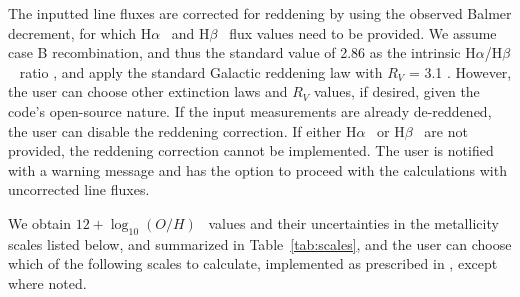 \documentclass{emulateapj}
\newcommand{\oxabinline}{\ensuremath{12 + \log_{10}(O/H)}}
\newcommand{\ha}{\ensuremath{\mathrm{H}\alpha}}
\newcommand{\hb}{\ensuremath{\mathrm{H}\beta}}
\begin{document}
The inputted line fluxes are corrected for reddening by using the observed Balmer decrement, for which \ha~ and  \hb~ flux values need to be provided. We assume case B recombination, and thus the standard value of 2.86 as the
intrinsic \ha/\hb~ ratio \citep{osterbrock89}, and apply the standard Galactic reddening law with $R_V$ = 3.1 \citep{cardelli89}. However, the user can choose other extinction laws and $R_V$ values, if desired, given the code's open-source nature. If the input measurements are already de-reddened, the user can disable the reddening correction. If either \ha~ or \hb~ are not provided, the reddening correction cannot be implemented. The user is notified with a warning message and has the option to proceed with the calculations with uncorrected line fluxes.

We obtain \oxabinline~ values and their uncertainties in the metallicity scales listed below, and summarized in Table~\ref{tab:scales}, and the user can choose which of the following scales to calculate, implemented as prescribed in \citet{kewley08}, except where noted. 
\end{document}
